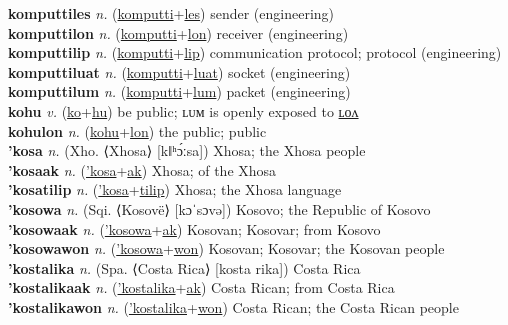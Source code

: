 \textbf{komputtiles} \textit{n.} (\hyperref[komputti]{komputti}+\hyperref[les]{les})
sender (engineering) \label{komputtiles} \\
\textbf{komputtilon} \textit{n.} (\hyperref[komputti]{komputti}+\hyperref[lon]{lon})
receiver (engineering) \label{komputtilon} \\
\textbf{komputtilip} \textit{n.} (\hyperref[komputti]{komputti}+\hyperref[lip]{lip})
communication protocol; protocol (engineering) \label{komputtilip} \\
\textbf{komputtiluat} \textit{n.} (\hyperref[komputti]{komputti}+\hyperref[luat]{luat})
socket (engineering) \label{komputtiluat} \\
\textbf{komputtilum} \textit{n.} (\hyperref[komputti]{komputti}+\hyperref[lum]{lum})
packet (engineering) \label{komputtilum} \\
\textbf{kohu} \textit{v.} (\hyperref[ko]{ko}+\hyperref[hu]{hu})
be public; ʟᴜᴍ is openly exposed to \hyperref[kohulon]{ʟᴏᴧ} \label{kohu} \\
\textbf{kohulon} \textit{n.} (\hyperref[kohu]{kohu}+\hyperref[lon]{lon})
the public; public \label{kohulon} \\
\textbf{'kosa} \textit{n.} (Xho. ⟨Xhosa⟩ [kǁʰɔ́ːsa])
Xhosa; the Xhosa people \label{'kosa} \\
\textbf{'kosaak} \textit{n.} (\hyperref['kosa]{'kosa}+\hyperref[ak]{ak})
Xhosa; of the Xhosa \label{'kosaak} \\
\textbf{'kosatilip} \textit{n.} (\hyperref['kosa]{'kosa}+\hyperref[tilip]{tilip})
Xhosa; the Xhosa language \label{'kosatilip} \\
\textbf{'kosowa} \textit{n.} (Sqi. ⟨Kosovë⟩ [kɔˈsɔvə])
Kosovo; the Republic of Kosovo \label{'kosowa} \\
\textbf{'kosowaak} \textit{n.} (\hyperref['kosowa]{'kosowa}+\hyperref[ak]{ak})
Kosovan; Kosovar; from Kosovo \label{'kosowaak} \\
\textbf{'kosowawon} \textit{n.} (\hyperref['kosowa]{'kosowa}+\hyperref[won]{won})
Kosovan; Kosovar; the Kosovan people \label{'kosowawon} \\
\textbf{'kostalika} \textit{n.} (Spa. ⟨Costa Rica⟩ [kosta rika])
Costa Rica \label{'kostalika} \\
\textbf{'kostalikaak} \textit{n.} (\hyperref['kostalika]{'kostalika}+\hyperref[ak]{ak})
Costa Rican; from Costa Rica \label{'kostalikaak} \\
\textbf{'kostalikawon} \textit{n.} (\hyperref['kostalika]{'kostalika}+\hyperref[won]{won})
Costa Rican; the Costa Rican people \label{'kostalikawon} \\
